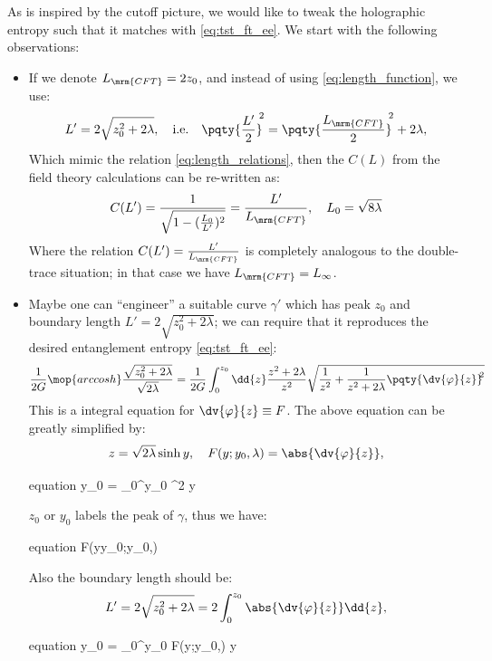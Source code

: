 \documentclass[a4paper
	,10pt
]{article}
\begin{document}
	As is inspired by the cutoff picture, we would like to tweak the holographic entropy such that it matches with \eqref{eq:tst_ft_ee}. 
	We start with the following observations: 
	\begin{itemize}
	\item If we denote $L_{\mrm{CFT}} = 2z_0$, and instead of using \eqref{eq:length_function}, we use:
	\begin{equation}
		L' = 2\sqrt{z_0^2 + 2\lambda},
	\quad\text{i.e.}\quad
		\pqty{\frac{L'}{2}}^{\!\!2}
		= \pqty{\frac{L_\mrm{CFT}}{2}}^{\!\!2} + 2\lambda,
	\end{equation}
	Which mimic the relation \eqref{eq:length_relations}, then the $C(L)$ from the field theory calculations can be re-written as:
	\begin{equation}
		C(L')
		= \frac{1}{\sqrt{1 - (\frac{L_0}{L'})^2}}
		= \frac{L'}{L_{\mrm{CFT}}},
	\quad L_0 = \sqrt{8\lambda}
	\end{equation}
	Where the relation $C(L') = \frac{L'}{L_{\mrm{CFT}}}$ is completely analogous to the double-trace situation; in that case we have $L_\mrm{CFT} = L_\infty$. 
	
	\pagebreak[3]
	
	\item Maybe one can ``engineer'' a suitable curve $\gamma'$ which has peak $z_0$ and boundary length $
		L' = 2\sqrt{z_0^2 + 2\lambda}
	$; we can require that it reproduces the desired entanglement entropy \eqref{eq:tst_ft_ee}:
	\begin{equation}
		\frac{1}{2G} \mop{arccosh}
			\frac{
				\sqrt{z_0^2 + 2\lambda}
			}{\sqrt{2\lambda}}
	  = \frac{1}{2G} \int_0^{z_0} \dd{z}
	    \frac{z^2 + 2\lambda}{z^2}
	      \sqrt{
	          \frac{1}{z^2}
	          + \frac{1}{z^2 + 2\lambda}
	          \pqty{\dv{\varphi}{z}}^{\!\!2}
	      } 
	\end{equation}
	This is a integral equation for $\dv{\varphi}{z} \equiv F$. The above equation can be greatly simplified by:
	\begin{equation}
		z = \sqrt{2\lambda} \sinh y,
	\quad
		F(y;y_0,\lambda)
		= \abs{\dv{\varphi}{z}},
	\end{equation}
	\begin{empheq}{equation}
		y_0
		= \int_0^{y_0} 
			\coth^2 y\,
	\end{empheq}
	
	$z_0$ or $y_0$ labels the peak of $\gamma$, thus we have:
	\begin{empheq}{equation}
		F(y\to y_0;y_0,\lambda) \to \infty
	\end{empheq}
	Also the boundary length should be:
	\begin{gather}
	  L' = 2\sqrt{z_0^2 + 2\lambda}
	  = 2\int_0^{z_0}
	      \abs{\dv{\varphi}{z}}
	      \dd{z},
	\end{gather}
	\begin{empheq}{equation}
		\cosh y_0
		= \int_0^{y_0}
			F(y;y_0,\lambda) \cosh y 
	\end{empheq}
	

\end{itemize}
\end{document}

